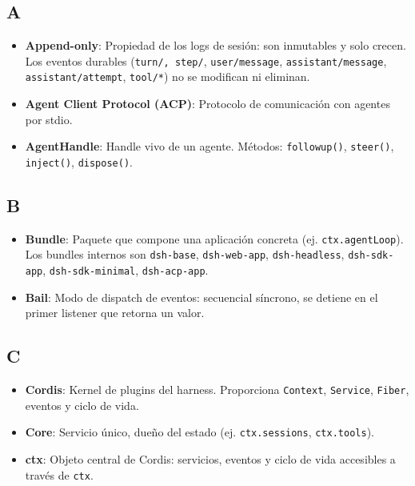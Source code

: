 \documentclass[11pt,a4paper]{article}
\begin{document}
\subsection*{A}


\begin{itemize}[leftmargin=*,topsep=2pt,itemsep=1pt]
  \item \textbf{Append-only}: Propiedad de los logs de sesión: son inmutables y solo crecen. Los eventos durables (\texttt{turn/\textit{}, \texttt{step/}}, \texttt{user/message}, \texttt{assistant/message}, \texttt{assistant/attempt}, \texttt{tool/*}) no se modifican ni eliminan.
  \item \textbf{Agent Client Protocol (ACP)}: Protocolo de comunicación con agentes por stdio.
  \item \textbf{AgentHandle}: Handle vivo de un agente. Métodos: \texttt{followup()}, \texttt{steer()}, \texttt{inject()}, \texttt{dispose()}.
\end{itemize}


\subsection*{B}


\begin{itemize}[leftmargin=*,topsep=2pt,itemsep=1pt]
  \item \textbf{Bundle}: Paquete que compone una aplicación concreta (ej. \texttt{ctx.agentLoop}). Los bundles internos son \texttt{dsh-base}, \texttt{dsh-web-app}, \texttt{dsh-headless}, \texttt{dsh-sdk-app}, \texttt{dsh-sdk-minimal}, \texttt{dsh-acp-app}.
  \item \textbf{Bail}: Modo de dispatch de eventos: secuencial síncrono, se detiene en el primer listener que retorna un valor.
\end{itemize}


\subsection*{C}


\begin{itemize}[leftmargin=*,topsep=2pt,itemsep=1pt]
  \item \textbf{Cordis}: Kernel de plugins del harness. Proporciona \texttt{Context}, \texttt{Service}, \texttt{Fiber}, eventos y ciclo de vida.
  \item \textbf{Core}: Servicio único, dueño del estado (ej. \texttt{ctx.sessions}, \texttt{ctx.tools}).
  \item \textbf{ctx}: Objeto central de Cordis: servicios, eventos y ciclo de vida accesibles a través de \texttt{ctx}.
\end{itemize}
\end{document}
